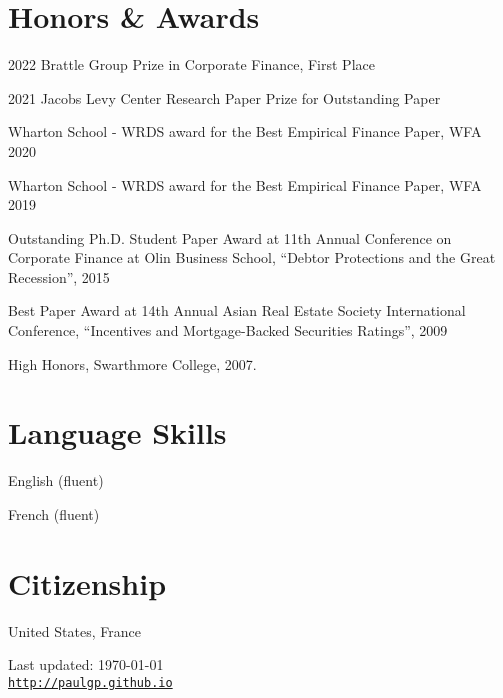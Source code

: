 \documentclass[letterpaper]{article}
\renewenvironment{itemize}{
  \begin{list}{}
    { \setlength{\itemsep}{5pt}
      \setlength{\parsep}{0pt}
      \setlength{\topsep}{0pt}
      \setlength{\leftmargin}{0em} } }{
  \end{list}}
\begin{document}
\section*{Honors \& Awards}
\begin{itemize}
\item 2022 Brattle Group Prize in Corporate Finance, First Place
\item 2021 Jacobs Levy Center Research Paper Prize for Outstanding Paper
\item Wharton School - WRDS award for the Best Empirical Finance Paper, WFA 2020
\item Wharton School - WRDS award for the Best Empirical Finance Paper, WFA 2019
\item Outstanding Ph.D. Student Paper Award at 11th Annual Conference
  on Corporate Finance at Olin Business School, ``Debtor Protections
  and the Great Recession'', 2015
\item Best Paper Award at 14th Annual Asian Real Estate Society
  International Conference, ``Incentives and Mortgage-Backed
  Securities Ratings'', 2009
\item High Honors, Swarthmore College, 2007.
\end{itemize}

\section*{Language Skills}
\begin{itemize}
\item English (fluent)
\item French (fluent)
\end{itemize}
\bigskip

\section*{Citizenship}
United States, France
\begin{center}
\begin{footnotesize}
Last updated: \today \\
\href{http://paulgp.github.io}{\tt http://paulgp.github.io}
\end{footnotesize}
\end{center}
\end{document}

